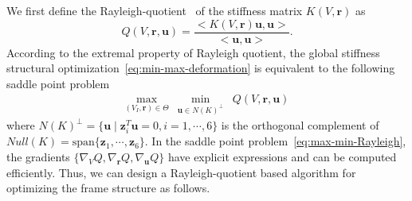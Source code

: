 We first define the Rayleigh-quotient~\cite{Parlett:1998} of the stiffness matrix $K(V,\mathbf{r})$ as
\begin{equation} \label{eq:rayleigh-quotient}
Q(V, \mathbf{r}, \mathbf{u})=\dfrac{<K( V  ,\mathbf{r})\mathbf{u},\mathbf{u}>}{<\mathbf{u},\mathbf{u}>}.
\end{equation}
According to the extremal property of Rayleigh quotient, the global stiffness structural optimization~\eqref{eq:min-max-deformation} is equivalent to the following saddle point problem
\begin{equation}\label{eq:max-min-Rayleigh}
\begin{array}{ccl}
\max\limits_{(V_I,\mathbf{r})\in\Theta} & \min\limits_{\mathbf{u}\in N(K)^{\perp}} & Q(V, \mathbf{r}, \mathbf{u})
\end{array}
\end{equation}
where $N(K)^{\perp}=\{\mathbf{u} \mid \mathbf{z}_i^T \mathbf{u}=0, i=1,\cdots,6\}$ is the orthogonal complement of
$Null(K)=\mathrm{span}\{\mathbf{z}_1,\cdots,\mathbf{z}_6\}$.
In the saddle point problem~\eqref{eq:max-min-Rayleigh}, the gradients $\{\nabla_{V} Q, \nabla_{\mathbf{r}} Q, \nabla_{\mathbf{u}} Q\}$
have explicit expressions and can be computed efficiently.
Thus, we can design a Rayleigh-quotient based algorithm for optimizing the frame structure as follows.



